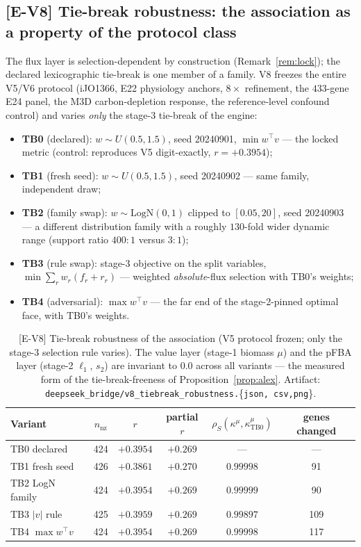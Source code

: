 \documentclass[11pt,a4paper]{article}
\theoremstyle{plain}
\theoremstyle{definition}
\theoremstyle{remark}
\newcommand{\kmu}{\kappa^{\mu}}
\begin{document}
\subsection{[E-V8] Tie-break robustness: the association as a property
of the protocol class}\label{sec:v8}

The flux layer is selection-dependent by construction
(Remark~\ref{rem:lock}); the declared lexicographic tie-break is one
member of a family. V8 freezes the entire V5/V6 protocol (iJO1366,
E22 physiology anchors, $8\times$ refinement, the $433$-gene E24
panel, the M3D carbon-depletion response, the reference-level
confound control) and varies \emph{only} the stage-3 tie-break of the
engine:
\begin{itemize}
\item \textbf{TB0} (declared): $w \sim U(0.5, 1.5)$, seed 20240901,
      $\min w^\top v$ --- the locked metric (control: reproduces V5
      digit-exactly, $r = +0.3954$);
\item \textbf{TB1} (fresh seed): $w \sim U(0.5, 1.5)$, seed 20240902
      --- same family, independent draw;
\item \textbf{TB2} (family swap): $w \sim \mathrm{LogN}(0, 1)$ clipped
      to $[0.05, 20]$, seed 20240903 --- a different distribution
      family with a roughly $130$-fold wider dynamic range
      (support ratio $400{:}1$ versus $3{:}1$);
\item \textbf{TB3} (rule swap): stage-3 objective on the split
      variables, $\min \sum_r w_r (f_r + r_r)$ --- weighted
      \emph{absolute}-flux selection with TB0's weights;
\item \textbf{TB4} (adversarial): $\max w^\top v$ --- the far end of
      the stage-2-pinned optimal face, with TB0's weights.
\end{itemize}

\begin{table}[t]
\centering
\caption{[E-V8] Tie-break robustness of the association (V5 protocol
frozen; only the stage-3 selection rule varies). The value layer
(stage-1 biomass $\mu$) and the pFBA layer (stage-2 $\ell_1$, $s_2$)
are invariant to $0.0$ across all variants --- the measured form of
the tie-break-freeness of Proposition~\ref{prop:alex}. Artifact:
\texttt{deepseek\_bridge/v8\_tiebreak\_robustness.}\{\texttt{json,
csv,png}\}.}
\label{tab:v8}
\begin{tabular}{lccccc}
\toprule
Variant & $n_{\mathrm{nz}}$ & $r$ & partial $r$ &
$\rho_S(\kmu, \kmu_{\mathrm{TB0}})$ & genes changed \\
\midrule
TB0 declared       & 424 & $+0.3954$ & $+0.269$ & --- & --- \\
TB1 fresh seed     & 426 & $+0.3861$ & $+0.270$ & $0.99998$ & 91 \\
TB2 LogN family    & 424 & $+0.3954$ & $+0.269$ & $0.99999$ & 90 \\
TB3 $|v|$ rule     & 425 & $+0.3959$ & $+0.269$ & $0.99897$ & 109 \\
TB4 $\max w^\top v$& 424 & $+0.3954$ & $+0.269$ & $0.99998$ & 117 \\
\bottomrule
\end{tabular}
\end{table}
\end{document}
